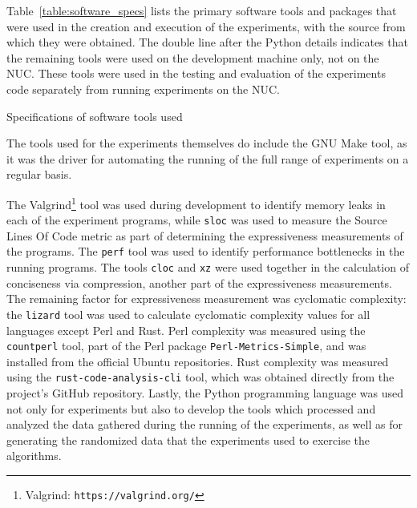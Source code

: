 Table~\ref{table:software_specs} lists the primary software tools and packages that were used in the creation and execution of the experiments, with the source from which they were obtained. The double line after the Python details indicates that the remaining tools were used on the development machine only, not on the NUC. These tools were used in the testing and evaluation of the experiments code separately from running experiments on the NUC.

\begin{table}[h!]
\begin{center}

\caption{Specifications of software tools used}
\label{table:software_specs}
\end{center}
\end{table}

The tools used for the experiments themselves do include the GNU Make tool, as it was the driver for automating the running of the full range of experiments on a regular basis.

The Valgrind\footnote{Valgrind: \texttt{https://valgrind.org/}} tool was used during development to identify memory leaks in each of the experiment programs, while \texttt{sloc} was used to measure the Source Lines Of Code metric as part of determining the expressiveness measurements of the programs. The \texttt{perf} tool was used to identify performance bottlenecks in the running programs. The tools \texttt{cloc} and \texttt{xz} were used together in the calculation of conciseness via compression, another part of the expressiveness measurements. The remaining factor for expressiveness measurement was cyclomatic complexity: the \texttt{lizard} tool was used to calculate cyclomatic complexity values for all languages except Perl and Rust. Perl complexity was measured using the \texttt{countperl} tool, part of the Perl package \texttt{Perl-Metrics-Simple}, and was installed from the official Ubuntu repositories. Rust complexity was measured using the \texttt{rust-code-analysis-cli} tool, which was obtained directly from the project's GitHub repository. Lastly, the Python programming language was used not only for experiments but also to develop the tools which processed and analyzed the data gathered during the running of the experiments, as well as for generating the randomized data that the experiments used to exercise the algorithms.
